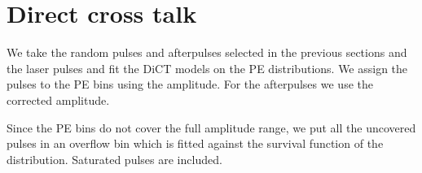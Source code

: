 \begin{figure}
    
    
    
\end{figure}

\section{Direct cross talk}

We take the random pulses and afterpulses selected in the previous sections and
the laser pulses and fit the DiCT models on the PE distributions. We assign the
pulses to the PE bins using the amplitude. For the afterpulses we use the
corrected amplitude.

Since the PE bins do not cover the full amplitude range, we put all the
uncovered pulses in an overflow bin which is fitted against the survival
function of the distribution. Saturated pulses are included.

\begin{figure}
    
    
    
\end{figure}

\begin{figure}
    

    
\end{figure}

\begin{figure}
    
    
    
\end{figure}

\begin{figure}
    
    
    
\end{figure}

